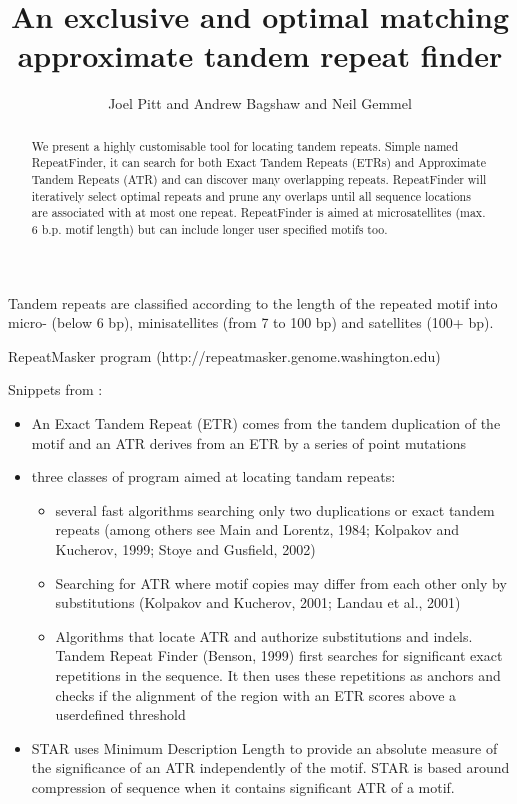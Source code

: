 \documentclass[a4paper]{article}
\title{An exclusive and optimal matching approximate tandem repeat finder}
\author{Joel Pitt and Andrew Bagshaw and Neil Gemmel}
\begin{document}
\maketitle

\begin{abstract}
We present a highly customisable tool for locating tandem repeats. Simple named RepeatFinder, it can search for both Exact Tandem Repeats (ETRs) and Approximate Tandem Repeats (ATR) and can discover many overlapping repeats. RepeatFinder will iteratively select optimal repeats and prune any overlaps until all sequence locations are associated with at most one repeat. RepeatFinder is aimed at microsatellites (max. 6 b.p. motif length) but can include longer user specified motifs too.
\end{abstract}

Tandem repeats are classified according to the length of the repeated motif into micro- (below 6 bp), minisatellites (from 7 to 100 bp) and satellites (100+ bp). 

RepeatMasker program (http://repeatmasker.genome.washington.edu)

Snippets from \cite{Delgrange04}:
\begin{itemize}
\item An Exact Tandem Repeat (ETR) comes from the tandem duplication of the motif and an ATR derives from an ETR by a series of point mutations

\item three classes of program aimed at locating tandam repeats:
\begin{itemize}
\item several fast algorithms searching only two duplications or exact tandem repeats (among others see Main and Lorentz, 1984; Kolpakov and Kucherov, 1999; Stoye and Gusfield, 2002)

\item Searching for ATR where motif copies may differ from each other only by substitutions (Kolpakov and Kucherov, 2001; Landau et al., 2001)

\item Algorithms that locate ATR and authorize substitutions and indels. Tandem Repeat Finder (Benson, 1999) first searches for significant exact repetitions in the sequence. It then uses these repetitions as anchors and checks if the alignment of the region with an ETR scores above a userdefined threshold
\end{itemize}

\item STAR uses Minimum Description Length to provide an absolute measure of the significance of an ATR independently of the motif. STAR is based around compression of sequence when it contains significant ATR of a motif.

\end{itemize}
\end{document}
